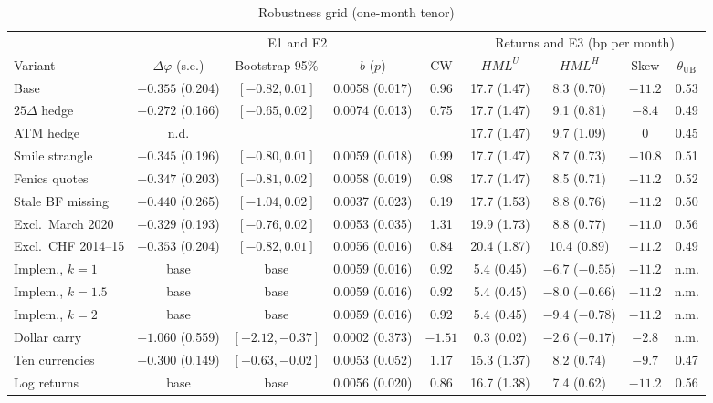 \documentclass[11pt]{article}
\theoremstyle{result}
\newcommand{\HML}{\mathit{HML}}
\newcommand{\thUB}{\theta_{\mathrm{UB}}}
\newcommand{\D}{\Delta}
\begin{document}
\begin{table}[t]
\centering\footnotesize
\setlength{\tabcolsep}{2pt}
\caption{Robustness grid (one-month tenor)}\label{tab:rob}
\begin{tabular}{lcccccccc}
\toprule
 & \multicolumn{4}{c}{E1 and E2} & \multicolumn{4}{c}{Returns and E3 (bp per month)}\\
\cmidrule(lr){2-5}\cmidrule(lr){6-9}
Variant & $\D\varphi$ (s.e.) & Bootstrap 95\% & $b$ ($p$) & CW & $\HML^U$ & $\HML^H$ & Skew & $\thUB$ \\
\midrule
Base & $-0.355$ (0.204) & $[-0.82,0.01]$ & 0.0058 (0.017) & 0.96 & 17.7 (1.47) & 8.3 (0.70) & $-11.2$ & 0.53 \\
$25\D$ hedge & $-0.272$ (0.166) & $[-0.65,0.02]$ & 0.0074 (0.013) & 0.75 & 17.7 (1.47) & 9.1 (0.81) & $-8.4$ & 0.49 \\
ATM hedge & n.d. & & & & 17.7 (1.47) & 9.7 (1.09) & 0 & 0.45 \\
Smile strangle & $-0.345$ (0.196) & $[-0.80,0.01]$ & 0.0059 (0.018) & 0.99 & 17.7 (1.47) & 8.7 (0.73) & $-10.8$ & 0.51 \\
Fenics quotes & $-0.347$ (0.203) & $[-0.81,0.02]$ & 0.0058 (0.019) & 0.98 & 17.7 (1.47) & 8.5 (0.71) & $-11.2$ & 0.52 \\
Stale BF missing & $-0.440$ (0.265) & $[-1.04,0.02]$ & 0.0037 (0.023) & 0.19 & 17.7 (1.53) & 8.8 (0.76) & $-11.2$ & 0.50 \\
Excl.\ March 2020 & $-0.329$ (0.193) & $[-0.76,0.02]$ & 0.0053 (0.035) & 1.31 & 19.9 (1.73) & 8.8 (0.77) & $-11.0$ & 0.56 \\
Excl.\ CHF 2014--15 & $-0.353$ (0.204) & $[-0.82,0.01]$ & 0.0056 (0.016) & 0.84 & 20.4 (1.87) & 10.4 (0.89) & $-11.2$ & 0.49 \\
Implem., $k=1$ & base & base & 0.0059 (0.016) & 0.92 & 5.4 (0.45) & $-6.7$ ($-0.55$) & $-11.2$ & n.m. \\
Implem., $k=1.5$ & base & base & 0.0059 (0.016) & 0.92 & 5.4 (0.45) & $-8.0$ ($-0.66$) & $-11.2$ & n.m. \\
Implem., $k=2$ & base & base & 0.0059 (0.016) & 0.92 & 5.4 (0.45) & $-9.4$ ($-0.78$) & $-11.2$ & n.m. \\
Dollar carry & $-1.060$ (0.559) & $[-2.12,-0.37]$ & 0.0002 (0.373) & $-1.51$ & 0.3 (0.02) & $-2.6$ ($-0.17$) & $-2.8$ & n.m. \\
Ten currencies & $-0.300$ (0.149) & $[-0.63,-0.02]$ & 0.0053 (0.052) & 1.17 & 15.3 (1.37) & 8.2 (0.74) & $-9.7$ & 0.47 \\
Log returns & base & base & 0.0056 (0.020) & 0.86 & 16.7 (1.38) & 7.4 (0.62) & $-11.2$ & 0.56 \\

\end{tabular}
\end{table}
\end{document}
